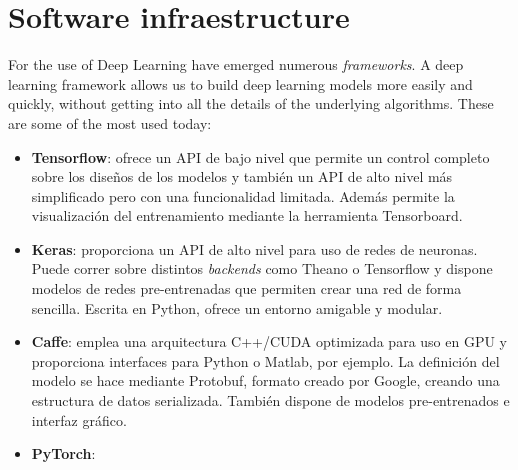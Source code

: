 \chapter{Software infraestructure}

For the use of Deep Learning have emerged numerous \textit{frameworks}. A deep learning framework allows us to build deep learning models more easily and quickly, without getting into all the details of the underlying algorithms. These are some of the most used today:
\begin{itemize}
\item \textbf{Tensorflow}: ofrece un API de bajo nivel que permite un control completo sobre los diseños de los modelos y también un API de alto nivel más simplificado pero con una funcionalidad limitada. Además permite la visualización del entrenamiento mediante la herramienta Tensorboard.
\item \textbf{Keras}: proporciona un API de alto nivel para uso de redes de neuronas. Puede correr sobre distintos \textit{backends} como Theano o Tensorflow y dispone modelos de redes pre-entrenadas que permiten crear una red de forma sencilla. Escrita en Python, ofrece un entorno amigable y modular.
\item \textbf{Caffe}: emplea una arquitectura C++/CUDA optimizada para uso en GPU y proporciona interfaces para Python o Matlab, por ejemplo. La definición del modelo se hace mediante Protobuf, formato creado por Google, creando una estructura de datos serializada. También dispone de modelos pre-entrenados e interfaz gráfico.
\item \textbf{PyTorch}:
\end{itemize}